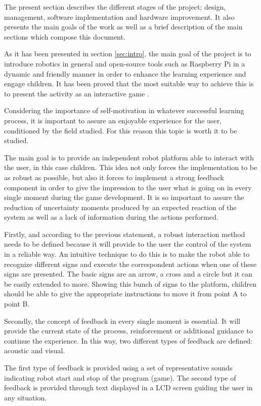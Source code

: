 The present section describes the different stages of the project; design, management, software implementation and hardware improvement. It also presents the main goals of the work as well as a brief description of the main sections which compose this document.

As it has been presented in section \ref{sec:intro}, the main goal of the project is to introduce robotics in general and open-source tools such as Raspberry Pi in a dynamic and friendly manner in order to enhance the learning experience and engage children. It has been proved that the most suitable way to achieve this is to present the activity as an interactive game \cite{bransford1999people}.

Considering the importance of self-motivation in whatever successful learning process, it is important to assure an enjoyable experience for the user, conditioned by the field studied. For this reason this topic is worth it to be studied.

The main goal is to provide an independent robot platform able to interact with the user, in this case children. This idea not only forces the implementation to be as robust as possible, but also it forces to implement a strong feedback component in order to give the impression to the user what is going on in every single moment during the game development. It is so important to assure the reduction of uncertainty moments produced by an expected reaction of the system as well as a lack of information during the actions performed. 

Firstly, and according to the previous statement, a robust interaction method needs to be defined because it will provide to the user the control of the system in a reliable way. An intuitive technique to do this is to make the robot able to recognize different signs and execute the correspondent actions when one of these signs are presented. The basic signs are an arrow, a cross and a circle but it can be easily extended to more. Showing this bunch of signs to the platform, children should be able to give the appropriate instructions to move it from point A to point B.

Secondly, the concept of feedback in every single moment is essential. It will provide the current state of the process, reinforcement or additional guidance to continue the experience. In this way, two different types of feedback are defined: acoustic and visual. 

The first type of feedback is provided using a set of representative sounds indicating robot start and stop of the program (game). The second type of feedback is provided through text displayed in a LCD screen guiding the user in any situation.

